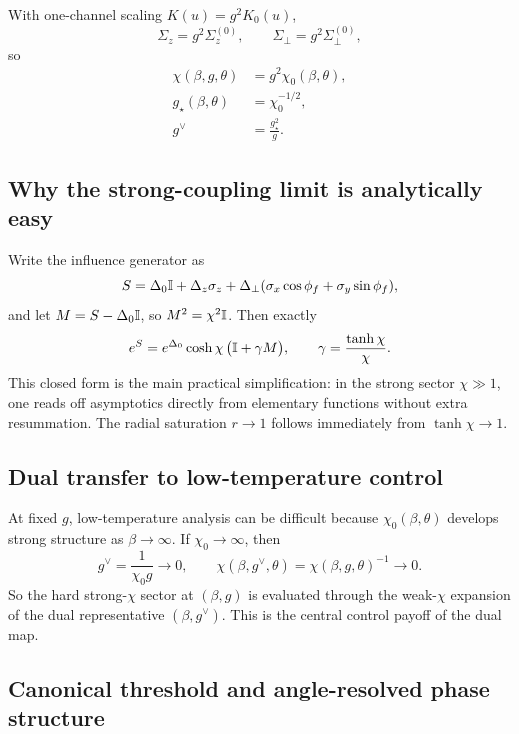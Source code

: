 With one-channel scaling \(K(u)=g^2K_0(u)\),
\begin{equation}
  \Sigma_z=g^2\Sigma_z^{(0)},\qquad
  \Sigma_\perp=g^2\Sigma_\perp^{(0)},
\end{equation}
so
\begin{align}
  \chi(\beta,g,\theta) &= g^2\chi_0(\beta,\theta), \\
  g_\star(\beta,\theta) &= \chi_0^{-1/2}, \\
  g^\vee &= \frac{g_\star^2}{g}.
\end{align}

\subsection{Why the strong-coupling limit is analytically easy}

Write the influence generator as
\begin{equation}
  S = \Delta_0\mathbb{I} + \Delta_z \sigma_z + \Delta_\perp
  (\sigma_x\cos\phi_f + \sigma_y\sin\phi_f),
\end{equation}
and let \(M=S-\Delta_0\mathbb{I}\), so \(M^2=\chi^2\mathbb{I}\).
Then exactly
\begin{equation}
  e^S=e^{\Delta_0}\cosh\chi\,\big(\mathbb{I}+\gamma M\big),
  \qquad
  \gamma=\frac{\tanh\chi}{\chi}.
\end{equation}
This closed form is the main practical simplification: in the strong sector \(\chi\gg1\),
one reads off asymptotics directly from elementary functions without extra resummation.
The radial saturation \(r\to1\) follows immediately from \(\tanh\chi\to1\).

\subsection{Dual transfer to low-temperature control}

At fixed \(g\), low-temperature analysis can be difficult because \(\chi_0(\beta,\theta)\)
develops strong structure as \(\beta\to\infty\).
If \(\chi_0\to\infty\), then
\begin{equation}
  g^\vee=\frac{1}{\chi_0 g}\to0,
  \qquad
  \chi(\beta,g^\vee,\theta)=\chi(\beta,g,\theta)^{-1}\to0.
\end{equation}
So the hard strong-\(\chi\) sector at \((\beta,g)\) is evaluated through the weak-\(\chi\)
expansion of the dual representative \((\beta,g^\vee)\).
This is the central control payoff of the dual map.

\subsection{Canonical threshold and angle-resolved phase structure}
\label{subsec:ground_state_phase_transitions_v2}

